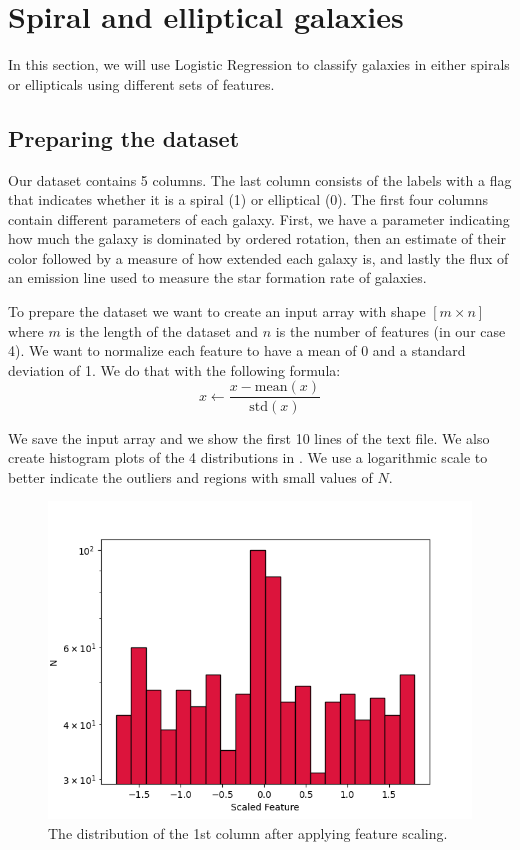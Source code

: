 \documentclass[a4paper,10pt]{article}
\begin{document}
\section{Spiral and elliptical galaxies}

In this section, we will use Logistic Regression to classify galaxies in either spirals or ellipticals using different sets of features.

\subsection{Preparing the dataset}
\label{sec:prep}

Our dataset contains 5 columns. The last column consists of the labels with a flag that indicates whether it is a spiral (1) or elliptical (0). The first four columns contain different parameters of each galaxy. First, we have a parameter indicating how much the galaxy is dominated by ordered rotation, then an estimate of their color followed by a measure of how extended each galaxy is, and lastly the flux of an emission line used to measure the star formation rate of galaxies. 

To prepare the dataset we want to create an input array with shape $[m \times n]$ where $m$ is the length of the dataset and $n$ is the number of features (in our case 4). We want to normalize each feature to have a mean of 0 and a standard deviation of 1. We do that with the following formula:
\begin{equation}
  x \leftarrow \frac{x-\mathrm{mean}(x)}{\mathrm{std}(x)}
\end{equation} 



We save the input array and we show the first 10 lines of the text file. We also create histogram plots of the 4 distributions in . We use a logarithmic scale to better indicate the outliers and regions with small values of $N$.



\begin{figure}[H]
  \centering
  \includegraphics[width=.7\linewidth]{./plots/distr_0.png}
  \caption{The distribution of the 1st column after applying feature scaling.}
  \label{fig:distr_1}
\end{figure}
\end{document}

